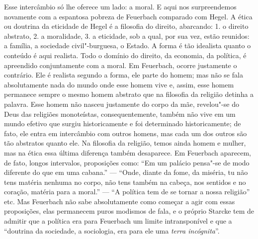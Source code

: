 Esse intercâmbio só lhe oferece um lado: a moral. E aqui nos
surpreendemos novamente com a espantosa pobreza
de Feuerbach comparado
com Hegel.
A ética ou doutrina da eticidade de Hegel é a filosofia do direito,
abarcando: 1. o direito abstrato, 2. a moralidade, 3. a eticidade, sob
a qual, por sua vez, estão reunidos: a família, a sociedade
civil"-burguesa, o Estado. A forma é tão idealista quanto o conteúdo é
aqui realista. Todo o domínio do direito, da economia, da política, é
apreendido conjuntamente com a moral.
Em Feuerbach,
ocorre justamente o contrário. Ele é realista segundo a forma, ele parte %
do homem; mas não se fala absolutamente nada do mundo onde esse homem
vive e, assim, esse homem permanece sempre o mesmo homem abstrato que na
filosofia da religião detinha a palavra. Esse homem não nasceu %
justamente do corpo da mãe, revelou"-se do Deus das religiões
monoteístas, consequentemente, também não vive em um mundo efetivo que
surgiu historicamente e foi determinado historicamente; de fato, ele
entra em intercâmbio com outros homens, mas cada um dos outros são tão
abstratos quanto ele. Na filosofia da religião, temos ainda homem e
mulher, mas na ética essa última diferença também desaparece.
Em Feuerbach
aparecem, de fato, longos intervalos, proposições como: ``Em um palácio
pensa"-se de modo diferente do que em uma cabana.'' --- ``Onde, diante da
fome, da miséria, tu não tens matéria nenhuma no corpo, não tens também
na cabeça, nos sentidos e no coração, matéria
para a moral.'' --- ``A política tem de se tornar a nossa
religião'' etc.
Mas Feuerbach não
sabe absolutamente como começar a agir com essas proposições, elas
permanecem puros modismos de fala, e o próprio Starcke tem de admitir
que a política era
para Feuerbach um
limite intransponível e que a ``doutrina da sociedade, a sociologia, era
para ele uma \emph{terra
incógnita}''.

